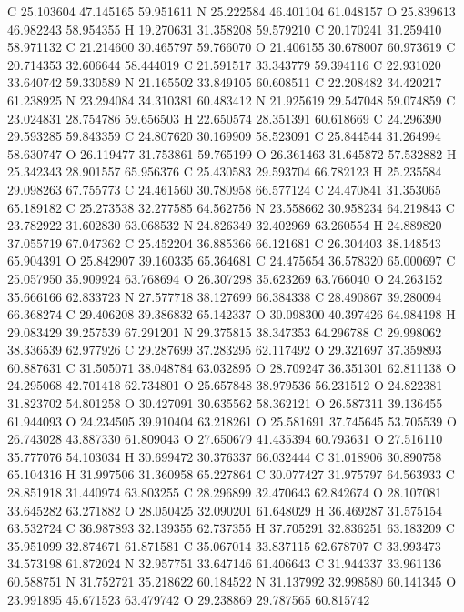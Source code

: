 \documentclass{article}
\begin{document}
C 25.103604 47.145165 59.951611 
N 25.222584 46.401104 61.048157 
O 25.839613 46.982243 58.954355 
H 19.270631 31.358208 59.579210 
C 20.170241 31.259410 58.971132 
C 21.214600 30.465797 59.766070 
O 21.406155 30.678007 60.973619 
C 20.714353 32.606644 58.444019 
C 21.591517 33.343779 59.394116 
C 22.931020 33.640742 59.330589 
N 21.165502 33.849105 60.608511 
C 22.208482 34.420217 61.238925 
N 23.294084 34.310381 60.483412 
N 21.925619 29.547048 59.074859 
C 23.024831 28.754786 59.656503 
H 22.650574 28.351391 60.618669 
C 24.296390 29.593285 59.843359 
C 24.807620 30.169909 58.523091 
C 25.844544 31.264994 58.630747 
O 26.119477 31.753861 59.765199 
O 26.361463 31.645872 57.532882 
H 25.342343 28.901557 65.956376 
C 25.430583 29.593704 66.782123 
H 25.235584 29.098263 67.755773 
C 24.461560 30.780958 66.577124 
C 24.470841 31.353065 65.189182 
C 25.273538 32.277585 64.562756 
N 23.558662 30.958234 64.219843 
C 23.782922 31.602830 63.068532 
N 24.826349 32.402969 63.260554 
H 24.889820 37.055719 67.047362 
C 25.452204 36.885366 66.121681 
C 26.304403 38.148543 65.904391 
O 25.842907 39.160335 65.364681 
C 24.475654 36.578320 65.000697 
C 25.057950 35.909924 63.768694 
O 26.307298 35.623269 63.766040 
O 24.263152 35.666166 62.833723 
N 27.577718 38.127699 66.384338 
C 28.490867 39.280094 66.368274 
C 29.406208 39.386832 65.142337 
O 30.098300 40.397426 64.984198 
H 29.083429 39.257539 67.291201 
N 29.375815 38.347353 64.296788 
C 29.998062 38.336539 62.977926 
C 29.287699 37.283295 62.117492 
O 29.321697 37.359893 60.887631 
C 31.505071 38.048784 63.032895 
O 28.709247 36.351301 62.811138 
O 24.295068 42.701418 62.734801 
O 25.657848 38.979536 56.231512 
O 24.822381 31.823702 54.801258 
O 30.427091 30.635562 58.362121 
O 26.587311 39.136455 61.944093 
O 24.234505 39.910404 63.218261 
O 25.581691 37.745645 53.705539 
O 26.743028 43.887330 61.809043 
O 27.650679 41.435394 60.793631 
O 27.516110 35.777076 54.103034 
H 30.699472 30.376337 66.032444 
C 31.018906 30.890758 65.104316 
H 31.997506 31.360958 65.227864 
C 30.077427 31.975797 64.563933 
C 28.851918 31.440974 63.803255 
C 28.296899 32.470643 62.842674 
O 28.107081 33.645282 63.271882 
O 28.050425 32.090201 61.648029 
H 36.469287 31.575154 63.532724 
C 36.987893 32.139355 62.737355 
H 37.705291 32.836251 63.183209 
C 35.951099 32.874671 61.871581 
C 35.067014 33.837115 62.678707 
C 33.993473 34.573198 61.872024 
N 32.957751 33.647146 61.406643 
C 31.944337 33.961136 60.588751 
N 31.752721 35.218622 60.184522 
N 31.137992 32.998580 60.141345 
O 23.991895 45.671523 63.479742 
O 29.238869 29.787565 60.815742 
\end{document}
